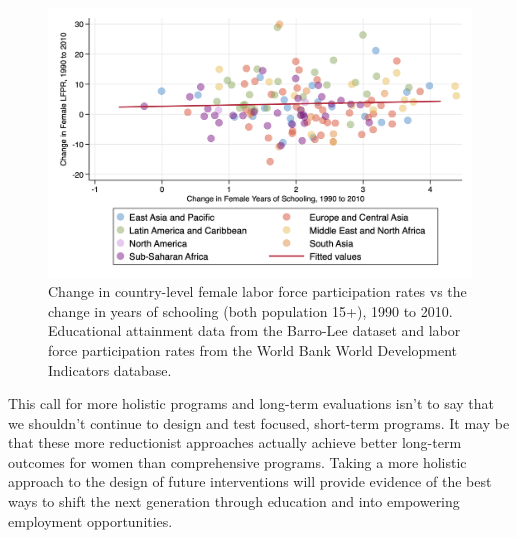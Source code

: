 \documentclass[11pt]{article}
\begin{document}
\begin{figure}
	\centering
	\includegraphics[width=0.9 \linewidth]{LFPRF_yrsch.png}
	\caption{\small Change in country-level female labor force participation rates vs the change in years of schooling (both population 15+), 1990 to 2010. Educational attainment data from the Barro-Lee dataset and labor force participation rates from the World Bank World Development Indicators database. }
	\label{fig:LFPRFyrsch}
\end{figure}

This call for more holistic programs and long-term evaluations isn't to say that we shouldn't continue to design and test focused, short-term programs. It may be that these more reductionist approaches actually achieve better long-term outcomes for women than comprehensive programs. Taking a more holistic approach to the design of future interventions will provide evidence of the best ways to shift the next generation through education and into empowering employment opportunities. 
\end{document}
